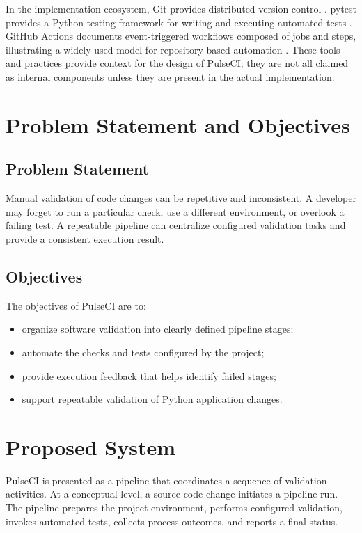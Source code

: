 \documentclass[conference]{IEEEtran}
\begin{document}
In the implementation ecosystem, Git provides distributed version control \cite{git}. pytest provides a Python testing framework for writing and executing automated tests \cite{pytest}. GitHub Actions documents event-triggered workflows composed of jobs and steps, illustrating a widely used model for repository-based automation \cite{actions}. These tools and practices provide context for the design of PulseCI; they are not all claimed as internal components unless they are present in the actual implementation.

\section{Problem Statement and Objectives}
\subsection{Problem Statement}
Manual validation of code changes can be repetitive and inconsistent. A developer may forget to run a particular check, use a different environment, or overlook a failing test. A repeatable pipeline can centralize configured validation tasks and provide a consistent execution result.

\subsection{Objectives}
The objectives of PulseCI are to:
\begin{itemize}
    \item organize software validation into clearly defined pipeline stages;
    \item automate the checks and tests configured by the project;
    \item provide execution feedback that helps identify failed stages;
    \item support repeatable validation of Python application changes.
\end{itemize}

\section{Proposed System}
PulseCI is presented as a pipeline that coordinates a sequence of validation activities. At a conceptual level, a source-code change initiates a pipeline run. The pipeline prepares the project environment, performs configured validation, invokes automated tests, collects process outcomes, and reports a final status.
\end{document}
